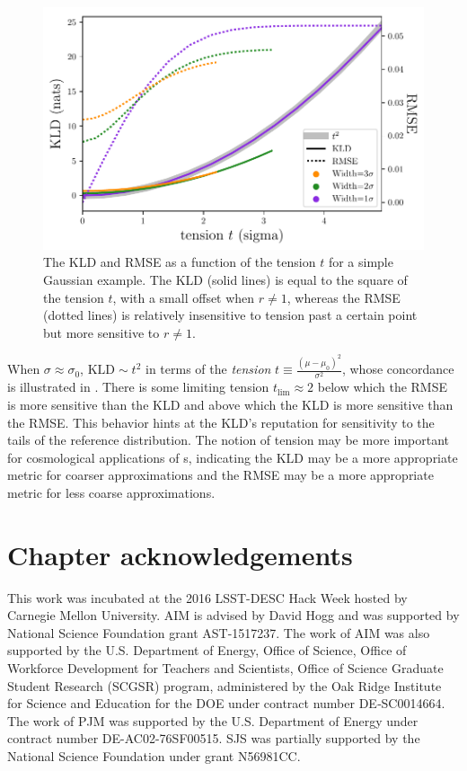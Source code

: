 \begin{figure}
	\begin{center}
		\includegraphics[width=\columnwidth]{figures/qp/tension.pdf}
		\caption{The KLD and RMSE as a function of the tension $t$ for a simple 
			Gaussian example.
			The KLD (solid lines) is equal to the square of the tension $t$, with a 
			small offset when $r\neq1$, whereas the RMSE (dotted lines) is relatively 
			insensitive to tension past a certain point but more sensitive to $r\neq1$.
			}
	\end{center}
\end{figure}

When $\sigma\approx\sigma_{0}$, $\mathrm{KLD}\sim t^{2}$ in terms of the 
\textit{tension} $t\equiv\frac{(\mu-\mu_{0})^{2}}{\sigma^{2}}$, whose 
concordance is illustrated in .
There is some limiting tension $t_{\mathrm{lim}}\approx2$ below which the RMSE 
is more sensitive than the KLD and above which the KLD is more sensitive than 
the RMSE.
This behavior hints at the KLD's reputation for sensitivity to the tails of the 
reference distribution.
The notion of tension may be more important for cosmological applications of 
\pz s, indicating the KLD may be a more appropriate metric for coarser 
approximations and the RMSE may be a more appropriate metric for less coarse 
approximations.

\section{Chapter acknowledgements}


This work was incubated at the 2016 LSST-DESC Hack Week hosted by Carnegie 
Mellon University.
AIM is advised by David Hogg and was supported by National Science Foundation 
grant AST-1517237.
The work of AIM was also supported by the U.S. Department of Energy, Office of 
Science, Office of Workforce Development for Teachers and Scientists, Office of 
Science Graduate Student Research (SCGSR) program, administered by the Oak 
Ridge Institute for Science and Education for the DOE under contract number 
DE‐SC0014664.
The work of PJM was supported by the U.S. Department of Energy under contract 
number DE-AC02-76SF00515.
SJS was partially supported by the National Science Foundation under grant 
N56981CC.

